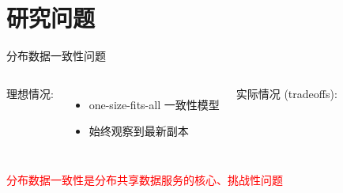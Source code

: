 \section{研究问题}

\begin{frame}{分布数据一致性问题}
  \begin{columns}[t]
	  理想情况:
	  \begin{itemize}
		\item one-size-fits-all 一致性模型
		\item 始终观察到最新副本
	  \end{itemize}
    \pause
	  实际情况 (tradeoffs):
  \end{columns}
  \pause
  \vspace{0.50cm}
  \begin{center}
	\textcolor{red}{分布数据一致性是分布共享数据服务的核心、挑战性问题}
  \end{center}
\end{frame}
%       
